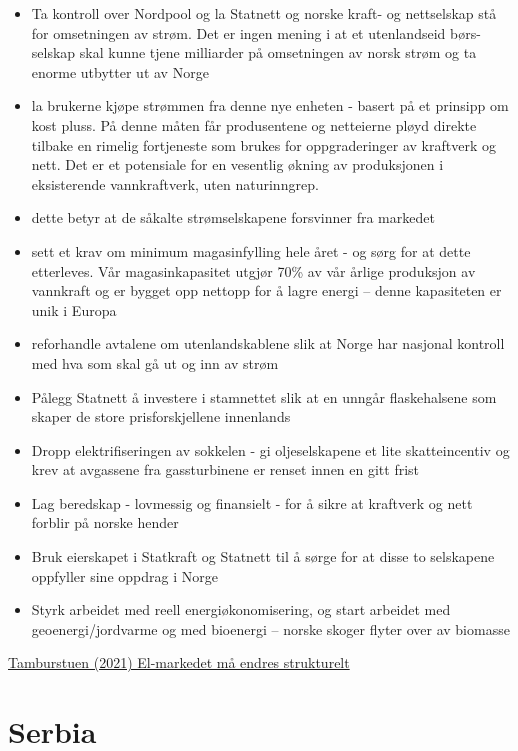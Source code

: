 \documentclass[
]{book}
\begin{document}
\begin{itemize}
\item
  Ta kontroll over Nordpool og la Statnett og norske kraft- og nettselskap stå for omsetningen av strøm. Det er ingen mening i at et utenlandseid børs-selskap skal kunne tjene milliarder på omsetningen av norsk strøm og ta enorme utbytter ut av Norge
\item
  la brukerne kjøpe strømmen fra denne nye enheten - basert på et prinsipp om kost pluss. På denne måten får produsentene og netteierne pløyd direkte tilbake en rimelig fortjeneste som brukes for oppgraderinger av kraftverk og nett. Det er et potensiale for en vesentlig økning av produksjonen i eksisterende vannkraftverk, uten naturinngrep.
\item
  dette betyr at de såkalte strømselskapene forsvinner fra markedet
\item
  sett et krav om minimum magasinfylling hele året - og sørg for at dette etterleves. Vår magasinkapasitet utgjør 70\% av vår årlige produksjon av vannkraft og er bygget opp nettopp for å lagre energi -- denne kapasiteten er unik i Europa
\item
  reforhandle avtalene om utenlandskablene slik at Norge har nasjonal kontroll med hva som skal gå ut og inn av strøm
\item
  Pålegg Statnett å investere i stamnettet slik at en unngår flaskehalsene som skaper de store prisforskjellene innenlands
\item
  Dropp elektrifiseringen av sokkelen - gi oljeselskapene et lite skatteincentiv og krev at avgassene fra gassturbinene er renset innen en gitt frist
\item
  Lag beredskap - lovmessig og finansielt - for å sikre at kraftverk og nett forblir på norske hender
\item
  Bruk eierskapet i Statkraft og Statnett til å sørge for at disse to selskapene oppfyller sine oppdrag i Norge
\item
  Styrk arbeidet med reell energiøkonomisering, og start arbeidet med geoenergi/jordvarme og med bioenergi -- norske skoger flyter over av biomasse
\end{itemize}

\href{https://www.dagensperspektiv.no/2021/el-markedet-ma-endres-strukturelt}{Tamburstuen (2021) El-markedet må endres strukturelt}

\hypertarget{serbia}{%
\chapter{Serbia}\label{serbia}}
\end{document}
